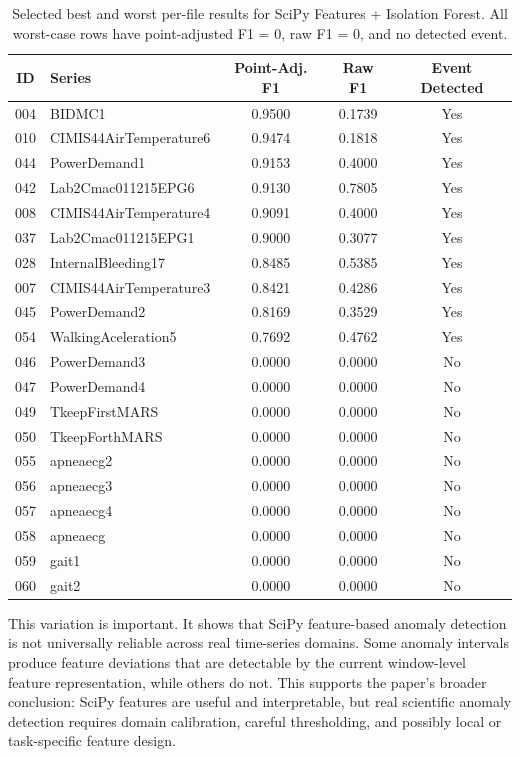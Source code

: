 \begin{table}[htbp]
\centering
\caption{Selected best and worst per-file results for SciPy Features + Isolation Forest. All worst-case rows have point-adjusted F1 = 0, raw F1 = 0, and no detected event.}
\label{tab:ucr-best-worst}
\small
\begin{tabular}{clccc}
\toprule
\textbf{ID} & \textbf{Series} & \textbf{Point-Adj. F1} & \textbf{Raw F1} & \textbf{Event Detected} \\
\midrule
004 & BIDMC1 & 0.9500 & 0.1739 & Yes \\
010 & CIMIS44AirTemperature6 & 0.9474 & 0.1818 & Yes \\
044 & PowerDemand1 & 0.9153 & 0.4000 & Yes \\
042 & Lab2Cmac011215EPG6 & 0.9130 & 0.7805 & Yes \\
008 & CIMIS44AirTemperature4 & 0.9091 & 0.4000 & Yes \\
037 & Lab2Cmac011215EPG1 & 0.9000 & 0.3077 & Yes \\
028 & InternalBleeding17 & 0.8485 & 0.5385 & Yes \\
007 & CIMIS44AirTemperature3 & 0.8421 & 0.4286 & Yes \\
045 & PowerDemand2 & 0.8169 & 0.3529 & Yes \\
054 & WalkingAceleration5 & 0.7692 & 0.4762 & Yes \\
\midrule
046 & PowerDemand3 & 0.0000 & 0.0000 & No \\
047 & PowerDemand4 & 0.0000 & 0.0000 & No \\
049 & TkeepFirstMARS & 0.0000 & 0.0000 & No \\
050 & TkeepForthMARS & 0.0000 & 0.0000 & No \\
055 & apneaecg2 & 0.0000 & 0.0000 & No \\
056 & apneaecg3 & 0.0000 & 0.0000 & No \\
057 & apneaecg4 & 0.0000 & 0.0000 & No \\
058 & apneaecg & 0.0000 & 0.0000 & No \\
059 & gait1 & 0.0000 & 0.0000 & No \\
060 & gait2 & 0.0000 & 0.0000 & No \\
\bottomrule
\end{tabular}
\end{table}

This variation is important. It shows that SciPy feature-based anomaly detection is not universally reliable across real time-series domains. Some anomaly intervals produce feature deviations that are detectable by the current window-level feature representation, while others do not. This supports the paper's broader conclusion: SciPy features are useful and interpretable, but real scientific anomaly detection requires domain calibration, careful thresholding, and possibly local or task-specific feature design.

